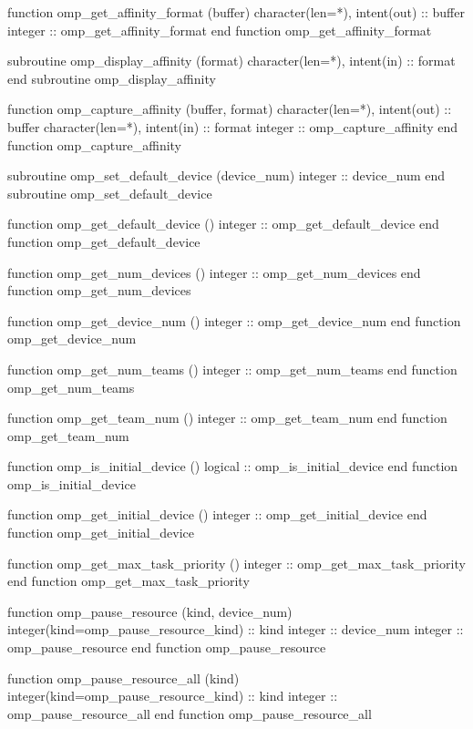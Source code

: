 {\begin{ompfFunction}
          function omp_get_affinity_format (buffer)
           character(len=*), intent(out) :: buffer
           integer :: omp_get_affinity_format
          end function omp_get_affinity_format

          subroutine omp_display_affinity (format)
           character(len=*), intent(in) :: format
          end subroutine omp_display_affinity

          function omp_capture_affinity (buffer, format)
           character(len=*), intent(out) :: buffer
           character(len=*), intent(in) :: format
           integer :: omp_capture_affinity
          end function omp_capture_affinity

          subroutine omp_set_default_device (device_num)
           integer :: device_num
          end subroutine omp_set_default_device

          function omp_get_default_device ()
           integer :: omp_get_default_device
          end function omp_get_default_device

          function omp_get_num_devices ()
           integer :: omp_get_num_devices
          end function omp_get_num_devices

          function omp_get_device_num ()
           integer :: omp_get_device_num
          end function omp_get_device_num

          function omp_get_num_teams ()
           integer :: omp_get_num_teams
          end function omp_get_num_teams

          function omp_get_team_num ()
           integer :: omp_get_team_num
          end function omp_get_team_num

          function omp_is_initial_device ()
           logical :: omp_is_initial_device
          end function omp_is_initial_device

          function omp_get_initial_device ()
           integer :: omp_get_initial_device
          end function omp_get_initial_device

          function omp_get_max_task_priority ()
           integer :: omp_get_max_task_priority
          end function omp_get_max_task_priority

          function omp_pause_resource (kind, device_num)
           integer(kind=omp_pause_resource_kind) :: kind
           integer :: device_num
           integer :: omp_pause_resource
          end function omp_pause_resource

          function omp_pause_resource_all (kind)
           integer(kind=omp_pause_resource_kind) :: kind
           integer :: omp_pause_resource_all
          end function omp_pause_resource_all


\end{ompfFunction}}
